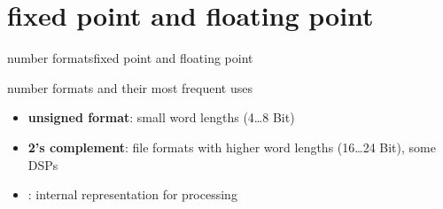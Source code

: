 \section[fixed vs. float]{fixed point and floating point}
	\begin{frame}{number formats}{fixed point and floating point}
	
		number formats and their most frequent uses
		\begin{itemize}
			\item	\textbf{unsigned format}: small word lengths (4\ldots 8 Bit)
			\pause
			\item	\textbf{2's complement}: file formats with higher word lengths (16\ldots 24 Bit), some DSPs
			\pause
			\item	{}: internal representation for processing
		\end{itemize}
	\end{frame}	
	
